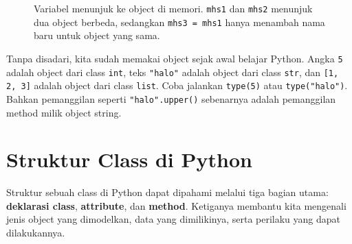 \begin{figure}[htbp]
\centering
{}
\caption{Variabel menunjuk ke object di memori. \texttt{mhs1} dan \texttt{mhs2} menunjuk dua object berbeda, sedangkan \texttt{mhs3 = mhs1} hanya menambah nama baru untuk object yang sama.}
\label{fig:b1-memori}
\end{figure}

\begin{info}
Tanpa disadari, kita sudah memakai object sejak awal belajar Python. Angka \texttt{5} adalah object dari class \texttt{int}, teks \texttt{"halo"} adalah object dari class \texttt{str}, dan \texttt{[1, 2, 3]} adalah object dari class \texttt{list}. Coba jalankan \texttt{type(5)} atau \texttt{type("halo")}. Bahkan pemanggilan seperti \texttt{"halo".upper()} sebenarnya adalah pemanggilan method milik object string.
\end{info}

\section{Struktur Class di Python}

Struktur sebuah class di Python dapat dipahami melalui tiga bagian utama: \textbf{deklarasi class}, \textbf{attribute}, dan \textbf{method}. Ketiganya membantu kita mengenali jenis object yang dimodelkan, data yang dimilikinya, serta perilaku yang dapat dilakukannya.

